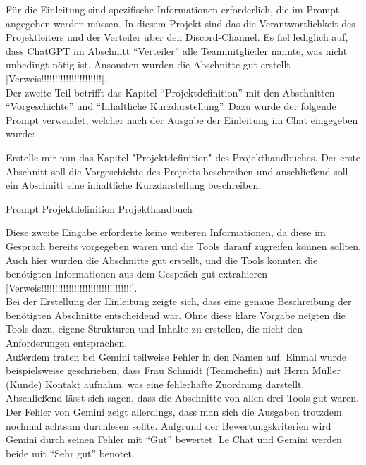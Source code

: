 Für die Einleitung sind spezifische Informationen erforderlich, die im Prompt angegeben werden müssen. In diesem Projekt sind das die 
Verantwortlichkeit des Projektleiters und der Verteiler über den Discord-Channel. Es fiel lediglich auf, dass ChatGPT im Abschnitt 
``Verteiler'' alle Teammitglieder nannte, was nicht unbedingt nötig ist. Ansonsten wurden die Abschnitte gut erstellt [Verweis!!!!!!!!!!!!!!!!!!!!!!].\\

Der zweite Teil betrifft das Kapitel ``Projektdefinition'' mit den Abschnitten ``Vorgeschichte'' und ``Inhaltliche Kurzdarstellung''. Dazu wurde 
der folgende Prompt verwendet, welcher nach der Ausgabe der Einleitung im Chat eingegeben wurde:

\begin{prompt}[H]
    \begin{tcolorbox}[colback=gray!20, colframe=gray!20, boxrule=0pt, sharp corners] 
        Erstelle mir nun das Kapitel "Projektdefinition" des Projekthandbuches. Der erste Abschnitt soll die Vorgeschichte des Projekts 
        beschreiben und anschließend soll ein Abschnitt eine inhaltliche Kurzdarstellung beschreiben.
        \vfill
    \end{tcolorbox}
    \caption{Prompt Projektdefinition Projekthandbuch}
    \label{Prompt Projektdefinition Projekthandbuch}
\end{prompt}

Diese zweite Eingabe erforderte keine weiteren Informationen, da diese im Gespräch bereits vorgegeben waren und die Tools darauf zugreifen 
können sollten. Auch hier wurden die Abschnitte gut erstellt, und die Tools konnten die benötigten Informationen aus dem Gespräch gut 
extrahieren [Verweis!!!!!!!!!!!!!!!!!!!!!!!!!!!!!!!!!].\\

Bei der Erstellung der Einleitung zeigte sich, dass eine genaue Beschreibung der benötigten Abschnitte entscheidend war. Ohne diese klare 
Vorgabe neigten die Tools dazu, eigene Strukturen und Inhalte zu erstellen, die nicht den Anforderungen entsprachen.\\

Außerdem traten bei Gemini teilweise Fehler in den Namen auf. Einmal wurde beispielsweise geschrieben, dass Frau Schmidt (Teamchefin) mit 
Herrn Müller (Kunde) Kontakt aufnahm, was eine fehlerhafte Zuordnung darstellt.\\

Abschließend lässt sich sagen, dass die Abschnitte von allen drei Tools gut waren. Der Fehler von Gemini zeigt allerdings, dass man sich 
die Ausgaben trotzdem nochmal achtsam durchlesen sollte. Aufgrund der Bewertungskriterien wird Gemini durch seinen Fehler mit ``Gut''
bewertet. Le Chat und Gemini werden beide mit ``Sehr gut'' benotet.

